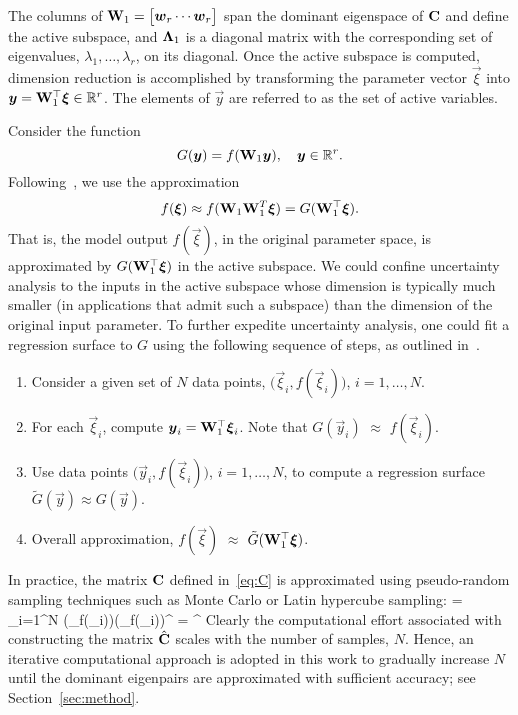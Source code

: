 \ee
The columns of $\mat{W}_1 = 
\begin{bmatrix} \vec{w}_r \cdots \vec{w}_r\end{bmatrix}$ 
span the dominant eigenspace of $\mathbf{{C}}$ and
define the active subspace, and $\mathbf{{\Lambda}}_1$ is a diagonal matrix with
the corresponding set of eigenvalues, $\lambda_1, \ldots, \lambda_r$, on its diagonal. 
Once the active subspace
is computed, dimension reduction is accomplished by transforming the parameter
vector $\vec\xi$ into 
$\vec{y} = \mat{W}_1^\top\vec{\xi} \in \R^r$. The elements of $\vec{y}$ are 
referred to as the set of active variables. 

Consider the function
\[
    G(\vec{y}) = f(\mat{W}_1\vec{y}), \quad \vec{y} \in \R^r.
\]
Following~\cite{Constantine:2015}, we use the approximation 
\[
f(\vec{\xi}) \approx f(\mat{W}_1 \mat{W}_1^T \vec\xi) =  
G(\mat{W}_1^\top \vec{\xi}).
\] 
That is, the model output $f(\vec\xi)$, in the original parameter space,
is approximated by $G(\mat{W}_1^\top \vec{\xi})$ in the active subspace.
We could confine uncertainty analysis to the inputs in the
active subspace whose dimension is typically much smaller (in applications that
admit such a subspace) than the dimension of the original input parameter. To further
expedite uncertainty analysis, one could fit a regression surface to $G$ using the 
following sequence of steps, as outlined in~\cite[chapter 4]{Constantine:2015}. 
\begin{enumerate}
\item Consider a given set of $N$ 
data points, $\big(\vec{\xi}_i, f(\vec{\xi}_i)\big)$, $i = 1, \ldots, N$. 
\item For each $\vec{\xi}_i$, compute $\vec{y}_i = \mat{W}_1^\top\vec{\xi}_i$. Note that
 $G(\vec{y}_i)$ $\approx$ $f(\vec{\xi}_i)$.
\item Use data points $\big(\vec{y}_i, f(\vec\xi_i)\big)$, $i = 1, \ldots, N$, to compute a 
regression surface $\tilde{G}(\vec{y})\approx 
G(\vec{y})$.
\item Overall approximation, $f(\vec{\xi})$ $\approx$ $\tilde{G}(\mat{W}_1^\top\vec{\xi})$.
\end{enumerate}

In practice, the matrix $\mathbf{{C}}$ defined in~\eqref{eq:C} is 
approximated using pseudo-random sampling techniques such as Monte Carlo or
Latin hypercube sampling:
 \be
 \approx {} = \sum\limits_{i=1}^{N} 
 (\nabla_{\vec{\xi}}f(\vec{\xi}_i))(\nabla_{\vec{\xi}}f(\vec{\xi}_i))^\top
 = \hat{\mat{\Lambda}}^\top
\label{eq:chat}
 \ee
Clearly the computational effort associated with constructing the matrix
$\hat{\mathbf{{C}}}$ scales with the number of samples, $N$. Hence, an iterative
computational approach is adopted in this work to gradually increase  
$N$ until the dominant eigenpairs are approximated
with sufficient accuracy; see Section~\ref{sec:method}. 

